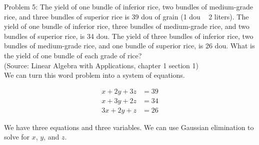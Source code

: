 \documentclass{article}
\begin{document}
Problem 5: The yield of one bundle of inferior rice, two bundles of medium-grade rice, and three bundles of superior rice is 39 dou of grain (1 dou ~ 2 liters). The yield of one bundle of inferior rice, three bundles of medium-grade rice, and two bundles of superior rice, is 34 dou. The yield of three bundles of inferior rice, two bundles of medium-grade rice, and one bundle of superior rice, is 26 dou. What is the yield of one bundle of each grade of rice? \\

(Source: Linear Algebra with Applications, chapter 1 section 1) \\

We can turn this word problem into a system of equations.

\begin{align*}
x + 2y + 3z &= 39 \\
x + 3y + 2z &= 34 \\
3x + 2y + z &= 26
\end{align*}

We have three equations and three variables. We can use Gaussian elimination to solve for $x$, $y$, and $z$.
\end{document}
